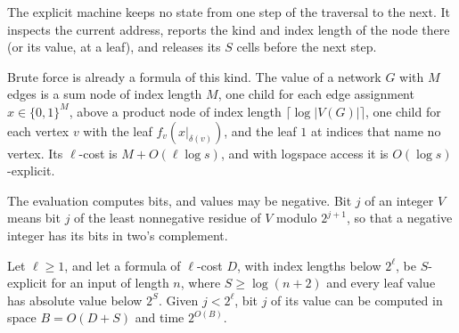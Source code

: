\documentclass[11pt]{article}
\theoremstyle{definition}
\theoremstyle{definition}
\theoremstyle{remark}
\begin{document}
The explicit machine keeps no state from one step of the traversal to the next. It inspects the current address, reports the kind and index length of the node there (or its value, at a leaf), and releases its $S$ cells before the next step.

Brute force is already a formula of this kind. The value of a network $G$ with $M$ edges is a sum node of index length $M$, one child for each edge assignment $x\in\{0,1\}^M$, above a product node of index length $\lceil\log|V(G)|\rceil$, one child for each vertex $v$ with the leaf $f_v(x|_{\delta(v)})$, and the leaf $1$ at indices that name no vertex. Its $\ell$-cost is $M+O(\ell\log s)$, and with logspace access it is $O(\log s)$-explicit.

The evaluation computes bits, and values may be negative. Bit $j$ of an integer $V$ means bit $j$ of the least nonnegative residue of $V$ modulo $2^{j+1}$, so that a negative integer has its bits in two's complement.

\begin{proposition}\label{lem:formula}
Let $\ell\ge1$, and let a formula of $\ell$-cost $D$, with index lengths below $2^\ell$, be $S$-explicit for an input of length $n$, where $S\ge\log(n+2)$ and every leaf value has absolute value below $2^S$. Given $j<2^\ell$, bit $j$ of its value can be computed in space $B=O(D+S)$ and time $2^{O(B)}$.
\end{proposition}
\end{document}
